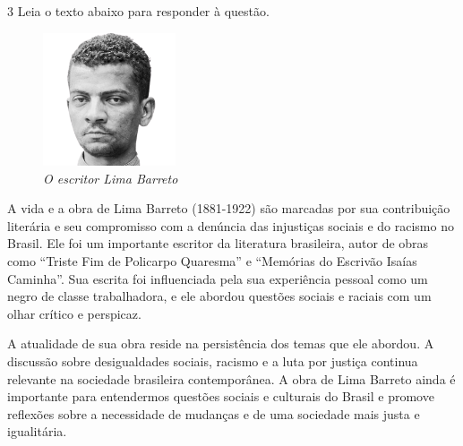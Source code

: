 \pagebreak
\num{3} Leia o texto abaixo para responder à questão.

\begin{myquote}

\begin{figure}  %
  \centering
  \includegraphics[width=0.35\textwidth]{./imgSAEB_7_POR/media/image43.png}
  \caption{\textit{O escritor Lima Barreto}}
\end{figure}

A vida e a obra de Lima Barreto (1881-1922) são marcadas por sua contribuição
literária e seu compromisso com a denúncia das injustiças sociais e do racismo
no Brasil. Ele foi um importante escritor da literatura brasileira, autor de
obras como ``Triste Fim de Policarpo Quaresma'' e ``Memórias do Escrivão
Isaías Caminha''. Sua escrita foi influenciada pela sua experiência pessoal
como um negro de classe trabalhadora, e ele abordou questões sociais e raciais
com um olhar crítico e perspicaz.

A atualidade de sua obra reside na persistência dos temas que ele abordou. 
A discussão sobre desigualdades sociais, racismo e a luta por justiça
continua relevante na sociedade brasileira contemporânea. A obra de Lima
Barreto ainda é importante para entendermos questões
sociais e culturais do Brasil e promove reflexões sobre a necessidade de
mudanças e de uma sociedade mais justa e igualitária. 





\end{myquote}

